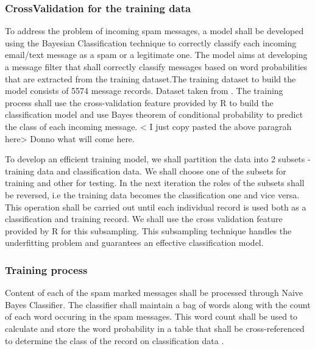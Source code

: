 \documentclass[9pt,twocolumn,twoside]{../../styles/osajnl}
\begin{document}
\subsubsection{CrossValidation for the training data}

To address the problem of incoming spam messages, a model shall be
developed using the Bayesian Classification technique to correctly
classify each incoming email/text message as a spam or a legitimate
one. The model aims at developing a message filter that shall
correctly classify messages based on word probabilities that are
extracted from the training dataset.The training dataset to build the
model consists of 5574 message records. Dataset taken from
\cite{www-sms-spam-dataset}. The training process shall use the
cross-validation feature provided by R to build the classification
model and use Bayes theorem of conditional probability to predict the
class of each incoming message.
< I just copy pasted the above paragrah here> Donno what will come here.

To develop an efficient training model, we shall partition the data
into 2 subsets - training data and classification data. We shall
choose one of the subsets for training and other for testing. In the
next iteration the roles of the subsets shall be reversed, i.e the
training data becomes the classification one and vice versa. This
operation shall be carried out until each individual record is used
both as a classification and training record. We shall use the cross
validation feature provided by R for this subsampling. This
subsampling technique handles the underfitting problem and guarantees
an effective classification model.


\subsubsection{Training process}
Content of each of the spam marked messages shall be processed through
Naive Bayes Classifier.  The classifier shall maintain a bag of words
along with the count of each word occuring in the spam messages. This
word count shall be used to calculate and store the word probability
in a table that shall be cross-referenced to determine the class of
the record on classification
data \cite{paper-classification-of-email}.
\end{document}
